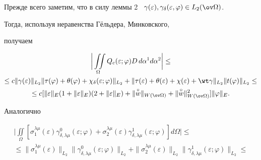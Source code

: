 \begin{pf} 


Прежде всего заметим, что в силу леммы 2 \ $\gamma(\varepsilon), 


\gamma_\delta(\varepsilon,\varphi)\in L_2(\ov\Omega)$. 


Тогда, используя неравенства Г\"ельдера, Минковского, 


получаем 


\begin{multline*} 


\bigg|\iint\limits_\Omega Q_c(\varepsilon;\varphi) 


D\,d\alpha^1d\alpha^2\bigg|\le \\ 


% 


\le c\|\gamma(\varepsilon)\|_{L_2} \|\tau(\varphi)+ \theta(\varphi)+ 


\chi_\delta(\varepsilon;\varphi)\|_{L_2}+ \|\tau(\varepsilon)+ 


\theta(\varepsilon)+\chi(\varepsilon)+\wt\gamma\|_{L_2} 


\|t(\varphi)\|_{L_2}\le \\ 


% 


\le c[\|\varepsilon\|_E(1+\|\varepsilon\|_E) (2+\|\varepsilon\|_E)+ 


\|\up{\circ}{w}\|_{W(\ov\Omega)}+ \|\up{\circ}{w}\|^2_{W(\ov\Omega)}] 


\|\varphi\|_E. 


\end{multline*} 


Аналогично 


\begin{multline*} 


\bigg|\iint\limits_\Omega[\sigma^{\lambda\mu}_1(\varepsilon) 


\gamma^0_{\delta,\lambda\mu}(\varepsilon;\varphi)+ 


\sigma^{\lambda\mu}_2(\varepsilon) \gamma^1_{\delta,\lambda\mu} 


(\varepsilon;\varphi)]d\Omega\bigg| \le \\ 


% 


\le\|\sigma^{\lambda\mu}_1(\varepsilon)\|_{L_2} 


\|\gamma^0_{\delta,\lambda\mu}(\varepsilon;\varphi)\|_{L_2} 


+\|\sigma^{\lambda\mu}_2(\varepsilon)\|_{L_2} 


\|\gamma^1_{\delta,\lambda\mu}(\varepsilon;\varphi)\|_{L_2}\le \\ 



\end{multline*}
\end{pf}
